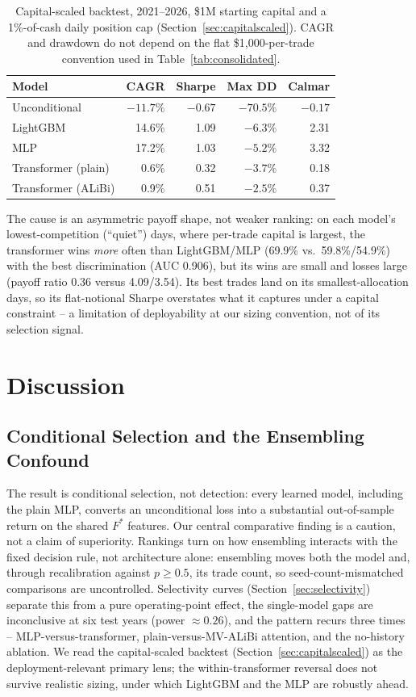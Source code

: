 \documentclass[sigconf,review]{acmart}
\begin{document}
\begin{table}[t]
\centering
\footnotesize
\begin{tabular}{lrrrr}
\toprule
Model & CAGR & Sharpe & Max DD & Calmar \\
\midrule
Unconditional & $-11.7\%$ & $-0.67$ & $-70.5\%$ & $-0.17$ \\
LightGBM & 14.6\% & 1.09 & $-6.3\%$ & 2.31 \\
MLP & 17.2\% & 1.03 & $-5.2\%$ & 3.32 \\
Transformer (plain) & 0.6\% & 0.32 & $-3.7\%$ & 0.18 \\
Transformer (ALiBi) & 0.9\% & 0.51 & $-2.5\%$ & 0.37 \\
\bottomrule
\end{tabular}
\caption{Capital-scaled backtest, 2021--2026, \$1M starting capital and a 1\%-of-cash daily position cap (Section~\ref{sec:capitalscaled}). CAGR and drawdown do not depend on the flat \$1,000-per-trade convention used in Table~\ref{tab:consolidated}.}
\label{tab:capitalscaled}
\end{table}

The cause is an asymmetric payoff shape, not weaker ranking: on each model's lowest-competition (``quiet'') days, where per-trade capital is largest, the transformer wins \emph{more} often than LightGBM/MLP (69.9\% vs.\ 59.8\%/54.9\%) with the best discrimination (AUC 0.906), but its wins are small and losses large (payoff ratio 0.36 versus 4.09/3.54). Its best trades land on its smallest-allocation days, so its flat-notional Sharpe overstates what it captures under a capital constraint -- a limitation of deployability at our sizing convention, not of its selection signal.

\section{Discussion}
\label{sec:discussion}

\subsection{Conditional Selection and the Ensembling Confound}
\label{sec:ensembling-discussion}
The result is conditional selection, not detection: every learned model, including the plain MLP, converts an unconditional loss into a substantial out-of-sample return on the shared $F^{\ast}$ features. Our central comparative finding is a caution, not a claim of superiority. Rankings turn on how ensembling interacts with the fixed decision rule, not architecture alone: ensembling moves both the model and, through recalibration against $p\ge0.5$, its trade count, so seed-count-mismatched comparisons are uncontrolled. Selectivity curves (Section~\ref{sec:selectivity}) separate this from a pure operating-point effect, the single-model gaps are inconclusive at six test years (power $\approx0.26$), and the pattern recurs three times -- MLP-versus-transformer, plain-versus-MV-ALiBi attention, and the no-history ablation. We read the capital-scaled backtest (Section~\ref{sec:capitalscaled}) as the deployment-relevant primary lens; the within-transformer reversal does not survive realistic sizing, under which LightGBM and the MLP are robustly ahead.
\end{document}
